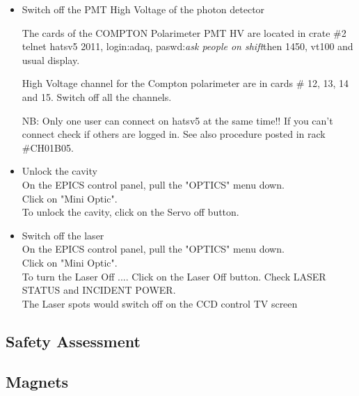{{\begin{itemize}
To make sure the detector is where you want watch the detector move on the TV screen (there is one 
in the Hall A counting house and one in the back room). The switches readback must oscillate a 
little bit if the system is running properly.

\item  Switch off the PMT High Voltage of the photon detector\\
\par The cards of the COMPTON Polarimeter PMT HV are located in crate \#2
telnet hatsv5 2011, login:adaq, paswd:{\it ask people on shift}then 1450, vt100 and usual display.
\par High Voltage channel for the Compton polarimeter are in cards \# 12, 13, 14 and 15.
Switch off all the channels.
\par NB: Only one user can connect on hatsv5 at the same time!! If you can't connect 
check if others are logged in. See also procedure posted in rack \#CH01B05.

\item Unlock the cavity\\
On the EPICS control panel, pull the "OPTICS" menu down. \\
Click on "Mini Optic".\\
To unlock the cavity, click on the Servo off button.\\
\item Switch off the laser\\
On the EPICS control panel, pull the "OPTICS" menu down.\\
 Click on "Mini Optic".\\
 To turn the Laser Off .... Click on the Laser Off button.
 Check LASER STATUS and INCIDENT POWER.\\
 The Laser spots would switch off on the CCD control TV screen
\end {itemize}
} %

\begin{safetyen}{0}{0}
\section {Safety Assessment}
\label{sec:compton_safety}
\end{safetyen}

\begin{safetyen}{10}{15}
\subsection{Magnets}


\end{safetyen}}
